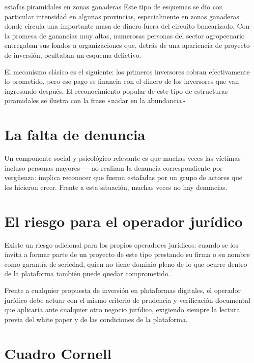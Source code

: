 \documentclass[12pt,oneside]{book}
\begin{document}
\begin{example}{estafas piramidales en zonas ganaderas}
Este tipo de esquemas se dio con particular intensidad en algunas provincias, especialmente en zonas ganaderas donde circula una importante masa de dinero fuera del circuito bancarizado. Con la promesa de ganancias muy altas, numerosas personas del sector agropecuario entregaban sus fondos a organizaciones que, detrás de una apariencia de proyecto de inversión, ocultaban un esquema delictivo.

El mecanismo clásico es el siguiente: los primeros inversores cobran efectivamente lo prometido, pero ese pago se financia con el dinero de los inversores que van ingresando después. El reconocimiento popular de este tipo de estructuras piramidales se ilustra con la frase «nadar en la abundancia».
\end{example}

\section{La falta de denuncia}

Un componente social y psicológico relevante es que muchas veces las víctimas --- incluso personas mayores --- no realizan la denuncia correspondiente por vergüenza: implica reconocer que fueron estafadas por un grupo de actores que les hicieron creer. Frente a esta situación, muchas veces no hay denuncias.

\section{El riesgo para el operador jurídico}

\begin{important}
Existe un riesgo adicional para los propios operadores jurídicos: cuando se los invita a formar parte de un proyecto de este tipo prestando su firma o su nombre como garantía de seriedad, quien no tiene dominio pleno de lo que ocurre dentro de la plataforma también puede quedar comprometido.

Frente a cualquier propuesta de inversión en plataformas digitales, el operador jurídico debe actuar con el mismo criterio de prudencia y verificación documental que aplicaría ante cualquier otro negocio jurídico, exigiendo siempre la lectura previa del white paper y de las condiciones de la plataforma.
\end{important}

\section{Cuadro Cornell}
\end{document}
